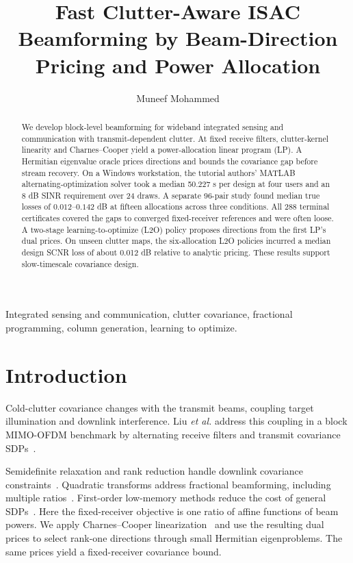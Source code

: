 \documentclass[journal]{IEEEtran}
\title{Fast Clutter-Aware ISAC Beamforming by Beam-Direction Pricing and Power Allocation}
\author{Muneef Mohammed}
\begin{document}
\maketitle
\setlength{\abovedisplayskip}{7pt plus 2pt minus 2pt}
\setlength{\belowdisplayskip}{7pt plus 2pt minus 2pt}
\setlength{\jot}{2pt}

\begin{abstract}
We develop block-level beamforming for wideband integrated sensing and communication with transmit-dependent clutter. At fixed receive filters, clutter-kernel linearity and Charnes--Cooper yield a power-allocation linear program (LP). A Hermitian eigenvalue oracle prices directions and bounds the covariance gap before stream recovery. On a Windows workstation, the tutorial authors' MATLAB alternating-optimization solver took a median 50.227 s per design at four users and an 8 dB SINR requirement over 24 draws. A separate 96-pair study found median true losses of \(0.012\)--\(0.142\) dB at fifteen allocations across three conditions. All 288 terminal certificates covered the gaps to converged fixed-receiver references and were often loose. A two-stage learning-to-optimize (L2O) policy proposes directions from the first LP's dual prices. On unseen clutter maps, the six-allocation L2O policies incurred a median design SCNR loss of about 0.012 dB relative to analytic pricing. These results support slow-timescale covariance design.
\end{abstract}

\begin{IEEEkeywords}
Integrated sensing and communication, clutter covariance, fractional programming, column generation, learning to optimize.
\end{IEEEkeywords}

\section{Introduction}
Cold-clutter covariance changes with the transmit beams, coupling target illumination and downlink interference. Liu \emph{et al.} address this coupling in a block MIMO-OFDM benchmark by alternating receive filters and transmit covariance SDPs~\cite{liu2026clutter}.

Semidefinite relaxation and rank reduction handle downlink covariance constraints~\cite{huang}. Quadratic transforms address fractional beamforming, including multiple ratios~\cite{shen}. First-order low-memory methods reduce the cost of general SDPs~\cite{yurtsever}. Here the fixed-receiver objective is one ratio of affine functions of beam powers. We apply Charnes--Cooper linearization~\cite{charnes} and use the resulting dual prices to select rank-one directions through small Hermitian eigenproblems. The same prices yield a fixed-receiver covariance bound.
\end{document}
